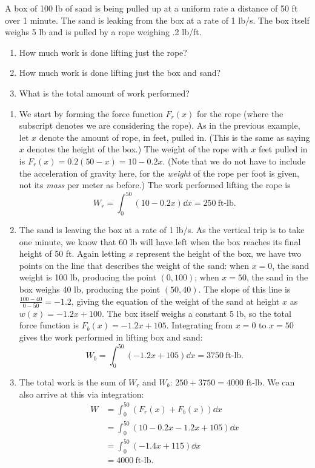 \begin{example}\label{ex_work2}%
A box of 100 lb of sand is being pulled up at a uniform rate a distance of 50 ft over 1 minute. The sand is leaking from the box at a rate of 1 lb/s. The box itself weighs 5 lb and is pulled by a rope weighing .2 lb/ft. 
\begin{enumerate}
	\item	How much work is done lifting just the rope?
	\item	How much work is done lifting just the box and sand?
	\item	What is the total amount of work performed?
\end{enumerate}
\solution
\begin{enumerate}
	\item	We start by forming the force function $F_r(x)$ for the rope (where the subscript denotes we are considering the rope). As in the previous example, let $x$ denote the amount of rope, in feet, pulled in. (This is the same as saying $x$ denotes the height of the box.) The weight of the rope with $x$ feet pulled in is $F_r(x) = 0.2(50-x) = 10-0.2x$. (Note that we do not have to include the acceleration of gravity here, for the \emph{weight} of the rope per foot is given, not its \emph{mass} per meter as before.) The work performed lifting the rope is 
	\[W_r = \int_0^{50} (10-0.2x)\dd x = 250\ \text{ft-lb}.\]
	
	\item	The sand is leaving the box at a rate of 1 lb/s. As the vertical trip is to take one minute, we know that 60 lb will have left when the box reaches its final height of 50 ft. Again letting $x$ represent the height of the box, we have two points on the line that describes the weight of the sand: when $x=0$, the sand weight is 100 lb, producing the point $(0,100)$; when $x=50$, the sand in the box weighs 40 lb, producing the point $(50,40)$. The slope of this line is $\frac{100-40}{0-50} = -1.2$, giving the equation of the weight of the sand at height $x$ as $w(x) = -1.2x+100$. The box itself weighs a constant 5 lb, so the total force function is $F_b(x) = -1.2x+105$. Integrating from $x=0$ to $x=50$ gives the work performed in lifting box and sand:
	\[W_b = \int_0^{50} (-1.2x+105)\dd x = 3750\ \text{ft-lb.}\]
	
	\item	The total work is the sum of $W_r$ and $W_b$: $250+3750=4000$ ft-lb. We can also arrive at this via integration:
	\begin{align*}
	W
	&= \int_0^{50} (F_r(x)+F_b(x))\dd x \\
	&= \int_0^{50} (10-0.2x-1.2x+105)\dd x \\
	&= \int_0^{50} (-1.4x+115) \dd x \\
	&= 4000 \ \text{ft-lb.}
	\end{align*}	
\end{enumerate}
\end{example}

